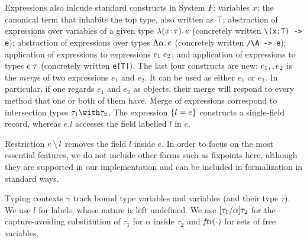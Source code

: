 Expressions also inlcude standard constructs in System
$F$: variables $ x $; the canonical term that inhabits the top type, also
written as $\top$; abstraction of expressions over variables of a given type
$\lambda (x \!:\! \tau).\, e$ (concretely written \lstinline$\(x:T) -> e$); 
abstraction of expressions over types $\Lambda \alpha.\, e$ (concretely written \lstinline$/\A -> e$); 
application of expressions to expressions $e_1 \; e_2$; 
and application of expressions to types $e \; \tau$ (concretely written \lstinline$e[T]$). 
The last four constructs are new:
$e_1 ,, e_2$ is the \emph{merge} of two expressions $e_1$ and $e_2$.
It can be used as either $ e_1 $ or $ e_2 $. In particular, if one regards $e_1$
and $e_2$ as objects, their merge will respond to every method that one or
both of them have. Merge of expressions correspond to intersection types
$ \tau_1 \andop \tau_2 $. The expression $ \{ l = e \} $ constructs a
single-field record, whereas $ e.l $ accesses the field labelled $ l $ in $ e $. 
\begin{comment}
Note that $ e $ does not
need to be a record type in this case. For example, although the merge of two
records
\[
x = \reccon {l_1} {e_1} \mergeop \reccon {l_1} {e_2} 
\]
is of an intersection type, $ x.{l_1} $ still gives $ e_1 $. On the other hand,
$ x.{l_3} $ will be rejected by the type system. 
\end{comment}
Restriction $e \setminus l$ removes the field $l$ inside $e$. In order to
focus on the most essential features, we do not include other forms such as
fixpoints here, although they are supported in our implementation and can
be included in formalization in standard ways.

Typing contexts $ \gamma $ track bound type variables and variables (and their
type $\tau$). We use $l$ for labels, whose nature is left undefined. We use
$\lbrack \tau_1 / \alpha \rbrack {\tau_2}$ for the capture-avoiding substitution of
$\tau_1$ for $\alpha$ inside $\tau_2$ and $\textit{ftv}({\cdot})$ for sets of free
variables.

\begin{comment}
\paragraph{Discussion.} A natural question the reader might ask is that why we
have excluded union types from the language. The answer is we found that
intersection types alone are enough support extensible designs. To focus on the
key features that make this language interesting, we also omit other common
constructs. For example, fixpoints can be added in standard ways.
\end{comment}

